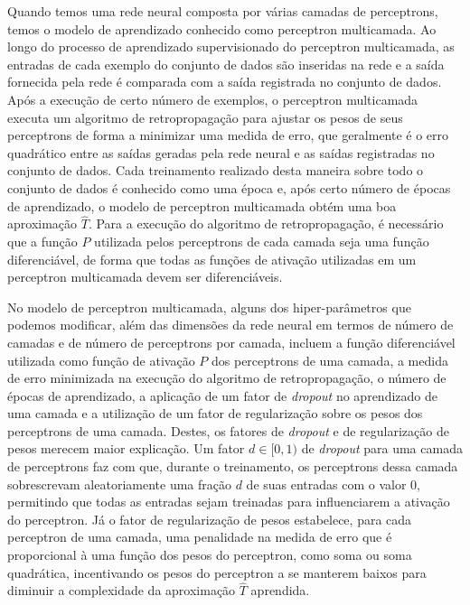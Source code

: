 Quando temos uma rede neural composta por várias camadas de perceptrons, temos o modelo de aprendizado conhecido como perceptron multicamada. Ao longo do processo de aprendizado supervisionado do perceptron multicamada, as entradas de cada exemplo do conjunto de dados são inseridas na rede e a saída fornecida pela rede é comparada com a saída registrada no conjunto de dados. Após a execução de certo número de exemplos, o perceptron multicamada executa um algoritmo de retropropagação para ajustar os pesos de seus perceptrons de forma a minimizar uma medida de erro, que geralmente é o erro quadrático entre as saídas geradas pela rede neural e as saídas registradas no conjunto de dados\cite[p.97]{machine_learning}. Cada treinamento realizado desta maneira sobre todo o conjunto de dados é conhecido como uma época e, após certo número de épocas de aprendizado, o modelo de perceptron multicamada obtém uma boa aproximação $\hat{T}$. Para a execução do algoritmo de retropropagação, é necessário que a função $P$ utilizada pelos perceptrons de cada camada seja uma função diferenciável, de forma que todas as funções de ativação utilizadas em um perceptron multicamada devem ser diferenciáveis.

No modelo de perceptron multicamada, alguns dos hiper-parâmetros que podemos modificar, além das dimensões da rede neural em termos de número de camadas e de número de perceptrons por camada, incluem a função diferenciável utilizada como função de ativação $P$ dos perceptrons de uma camada, a medida de erro minimizada na execução do algoritmo de retropropagação, o número de épocas de aprendizado, a aplicação de um fator de \textit{dropout} no aprendizado de uma camada e a utilização de um fator de regularização sobre os pesos dos perceptrons de uma camada. Destes, os fatores de \textit{dropout} e de regularização de pesos merecem maior explicação. Um fator $d \in [0, 1)$ de \textit{dropout} para uma camada de perceptrons faz com que, durante o treinamento, os perceptrons dessa camada sobrescrevam aleatoriamente uma fração $d$ de suas entradas com o valor 0, permitindo que todas as entradas sejam treinadas para influenciarem a ativação do perceptron. Já o fator de regularização de pesos estabelece, para cada perceptron de uma camada, uma penalidade na medida de erro que é proporcional à uma função dos pesos do perceptron, como soma ou soma quadrática, incentivando os pesos do perceptron a se manterem baixos para diminuir a complexidade da aproximação $\hat{T}$ aprendida\cite[p.111]{machine_learning}.

